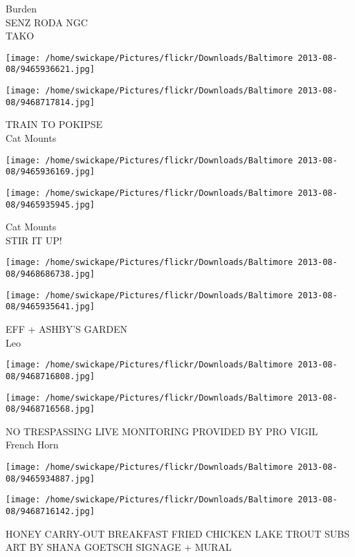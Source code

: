 \documentclass[10pt,letterpaper]{article}
\begin{document}
Burden\\
SENZ RODA NGC\\
TAKO
\pagebreak

\texttt{[image: /home/swickape/Pictures/flickr/Downloads/Baltimore 2013-08-08/9465936621.jpg]}

\vspace{0.25in}
\texttt{[image: /home/swickape/Pictures/flickr/Downloads/Baltimore 2013-08-08/9468717814.jpg]}

TRAIN TO POKIPSE\\
Cat Mounts
\pagebreak

\texttt{[image: /home/swickape/Pictures/flickr/Downloads/Baltimore 2013-08-08/9465936169.jpg]}

\vspace{0.25in}
\texttt{[image: /home/swickape/Pictures/flickr/Downloads/Baltimore 2013-08-08/9465935945.jpg]}

Cat Mounts\\
STIR IT UP!
\pagebreak

\texttt{[image: /home/swickape/Pictures/flickr/Downloads/Baltimore 2013-08-08/9468686738.jpg]}

\vspace{0.25in}
\texttt{[image: /home/swickape/Pictures/flickr/Downloads/Baltimore 2013-08-08/9465935641.jpg]}

EFF + ASHBY'S GARDEN\\
Leo
\pagebreak

\texttt{[image: /home/swickape/Pictures/flickr/Downloads/Baltimore 2013-08-08/9468716808.jpg]}

\vspace{0.25in}
\texttt{[image: /home/swickape/Pictures/flickr/Downloads/Baltimore 2013-08-08/9468716568.jpg]}

NO TRESPASSING LIVE MONITORING PROVIDED BY PRO VIGIL\\
French Horn
\pagebreak

\texttt{[image: /home/swickape/Pictures/flickr/Downloads/Baltimore 2013-08-08/9465934887.jpg]}

\vspace{0.25in}
\texttt{[image: /home/swickape/Pictures/flickr/Downloads/Baltimore 2013-08-08/9468716142.jpg]}

HONEY CARRY{-}OUT BREAKFAST FRIED CHICKEN LAKE TROUT SUBS\\
ART BY SHANA GOETSCH SIGNAGE + MURAL
\pagebreak
\end{document}
